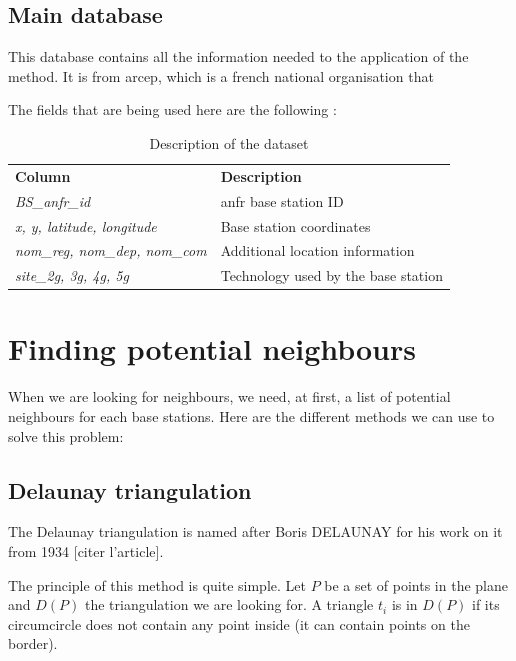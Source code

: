 \documentclass[lettersize,journal]{IEEEtran}
\begin{document}
    \subsection{Main database}

    This database \cite{main_database} contains all the information needed to the application of the method. It is from
    \acrfull{arcep}, which is a french national organisation that

    The fields that are being used here are the following :

    \begin{table}[!b]
        \centering
        \caption{Description of the dataset}
        \label{data_columns}
        \begin{tabular}{ll}
            \toprule
            \textbf{Column} & \textbf{Description} \\
            \cmidrule(lr){1-2}
            \textsl{BS\_anfr\_id} & \acrshort{anfr} base station ID \\ 
            \textsl{x, y, latitude, longitude} & Base station coordinates \\ 
            \textsl{nom\_reg, nom\_dep, nom\_com} & Additional location information \\  
            \textsl{site\_2g, 3g, 4g, 5g} & Technology used by the base station \\ 
            \bottomrule
        \end{tabular}
    \end{table}

\section{Finding potential neighbours}
\noindent When we are looking for neighbours, we need, at first, a list of potential neighbours for each base stations.
Here are the different methods we can use to solve this problem:

\subsection{Delaunay triangulation}
\noindent The Delaunay triangulation is named after Boris DELAUNAY for his work on it from 1934 [citer l'article].

The principle of this method is quite simple. Let $P$ be a set of points in the plane and $D(P)$ the triangulation we are looking for.
A triangle $t_i$ is in $D(P)$ if its circumcircle does not contain any point inside (it can contain points on the border).
\end{document}
